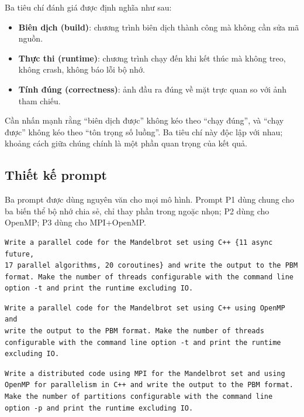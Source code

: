Ba tiêu chí đánh giá được định nghĩa như sau:

\begin{itemize}
  \item \textbf{Biên dịch (build)}: chương trình biên dịch thành công mà không
        cần sửa mã nguồn.
  \item \textbf{Thực thi (runtime)}: chương trình chạy đến khi kết thúc mà không
        treo, không crash, không báo lỗi bộ nhớ.
  \item \textbf{Tính đúng (correctness)}: ảnh đầu ra đúng về mặt trực quan so với
        ảnh tham chiếu.
\end{itemize}

Cần nhấn mạnh rằng “biên dịch được” không kéo theo “chạy đúng”, và “chạy được”
không kéo theo “tôn trọng số luồng”. Ba tiêu chí này độc lập với nhau; khoảng
cách giữa chúng chính là một phần quan trọng của kết quả.

\subsection{Thiết kế prompt}

Ba prompt được dùng nguyên văn cho mọi mô hình. Prompt P1 dùng chung cho ba biến
thể bộ nhớ chia sẻ, chỉ thay phần trong ngoặc nhọn; P2 dùng cho OpenMP; P3 dùng
cho MPI+OpenMP.

\begin{lstlisting}[language={},caption={Prompt P1 -- bộ nhớ chia sẻ với C++11/17/20.},label={lst:p1},numbers=none,basicstyle=\ttfamily\small]
Write a parallel code for the Mandelbrot set using C++ {11 async future,
17 parallel algorithms, 20 coroutines} and write the output to the PBM
format. Make the number of threads configurable with the command line
option -t and print the runtime excluding IO.
\end{lstlisting}

\begin{lstlisting}[language={},caption={Prompt P2 -- OpenMP.},label={lst:p2},numbers=none,basicstyle=\ttfamily\small]
Write a parallel code for the Mandelbrot set using C++ using OpenMP and
write the output to the PBM format. Make the number of threads
configurable with the command line option -t and print the runtime
excluding IO.
\end{lstlisting}

\begin{lstlisting}[language={},caption={Prompt P3 -- MPI+OpenMP.},label={lst:p3},numbers=none,basicstyle=\ttfamily\small]
Write a distributed code using MPI for the Mandelbrot set and using
OpenMP for parallelism in C++ and write the output to the PBM format.
Make the number of partitions configurable with the command line
option -p and print the runtime excluding IO.
\end{lstlisting}

